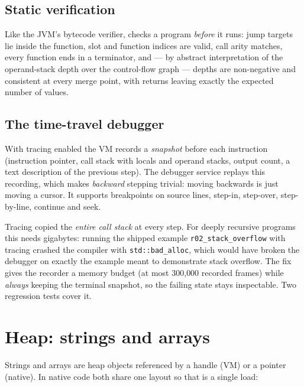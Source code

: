 \subsection{Static verification}
Like the JVM's bytecode verifier,  checks a program \emph{before} it runs: jump targets lie inside the function, slot and function indices are valid, call arity matches, every function ends in a terminator, and --- by abstract interpretation of the operand-stack depth over the control-flow graph --- depths are non-negative and consistent at every merge point, with returns leaving exactly the expected number of values.

\subsection{The time-travel debugger}
With tracing enabled the VM records a \emph{snapshot} before each instruction (instruction pointer, call stack with locals and operand stacks, output count, a text description of the previous step). The debugger service replays this recording, which makes \emph{backward} stepping trivial: moving backwards is just moving a cursor. It supports breakpoints on source lines, step-in, step-over, step-by-line, continue and seek.

\begin{bugbox}
Tracing copied the \emph{entire call stack} at every step. For deeply recursive programs this needs gigabytes: running the shipped example \texttt{r02\_stack\_overflow} with tracing crashed the compiler with \texttt{std::bad\_alloc}, which would have broken the debugger on exactly the example meant to demonstrate stack overflow. The fix gives the recorder a memory budget (at most 300{,}000 recorded frames) while \emph{always} keeping the terminal snapshot, so the failing state stays inspectable. Two regression tests cover it.
\end{bugbox}


\section{Heap: strings and arrays}
Strings and arrays are heap objects referenced by a handle (VM) or a pointer (native). In native code both share one layout so that  is a single load:

